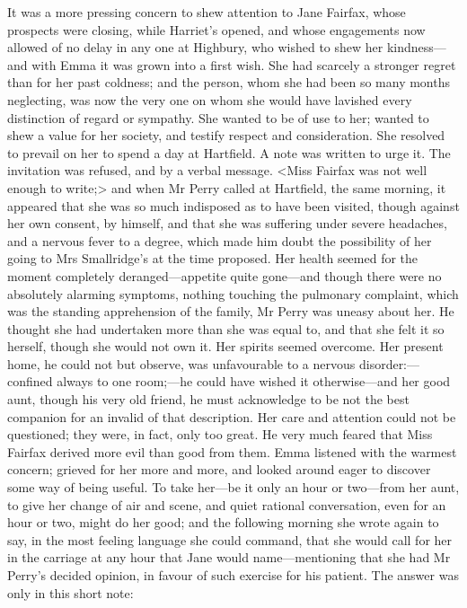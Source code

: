 It was a more pressing concern to shew attention to Jane Fairfax, whose prospects were closing, while Harriet's opened, and whose engagements now allowed of no delay in any one at Highbury, who wished to shew her kindness—and with Emma it was grown into a first wish. She had scarcely a stronger regret than for her past coldness; and the person, whom she had been so many months neglecting, was now the very one on whom she would have lavished every distinction of regard or sympathy. She wanted to be of use to her; wanted to shew a value for her society, and testify respect and consideration. She resolved to prevail on her to spend a day at Hartfield. A note was written to urge it. The invitation was refused, and by a verbal message. <Miss Fairfax was not well enough to write;> and when Mr Perry called at Hartfield, the same morning, it appeared that she was so much indisposed as to have been visited, though against her own consent, by himself, and that she was suffering under severe headaches, and a nervous fever to a degree, which made him doubt the possibility of her going to Mrs Smallridge's at the time proposed. Her health seemed for the moment completely deranged—appetite quite gone—and though there were no absolutely alarming symptoms, nothing touching the pulmonary complaint, which was the standing apprehension of the family, Mr Perry was uneasy about her. He thought she had undertaken more than she was equal to, and that she felt it so herself, though she would not own it. Her spirits seemed overcome. Her present home, he could not but observe, was unfavourable to a nervous disorder:—confined always to one room;—he could have wished it otherwise—and her good aunt, though his very old friend, he must acknowledge to be not the best companion for an invalid of that description. Her care and attention could not be questioned; they were, in fact, only too great. He very much feared that Miss Fairfax derived more evil than good from them. Emma listened with the warmest concern; grieved for her more and more, and looked around eager to discover some way of being useful. To take her—be it only an hour or two—from her aunt, to give her change of air and scene, and quiet rational conversation, even for an hour or two, might do her good; and the following morning she wrote again to say, in the most feeling language she could command, that she would call for her in the carriage at any hour that Jane would name—mentioning that she had Mr Perry's decided opinion, in favour of such exercise for his patient. The answer was only in this short note:

